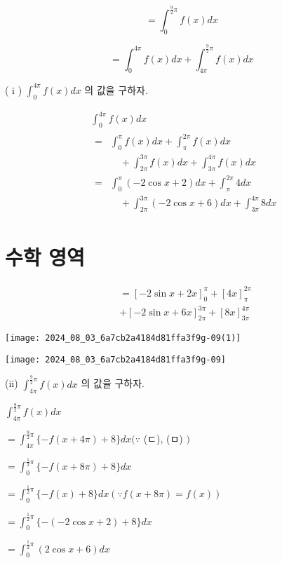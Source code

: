 \documentclass[10pt]{article}
\begin{document}
\[
=\int_{0}^{\frac{9}{2} \pi} f(x) d x
\]

\[
=\int_{0}^{4 \pi} f(x) d x+\int_{4 \pi}^{\frac{9}{2} \pi} f(x) d x
\]

( i ) \(\int_{0}^{4 \pi} f(x) d x\) 의 값을 구하자.

\[
\begin{aligned}
& \int_{0}^{4 \pi} f(x) d x \\
& \begin{aligned}
= & \int_{0}^{\pi} f(x) d x+\int_{\pi}^{2 \pi} f(x) d x \\
& \quad+\int_{2 \pi}^{3 \pi} f(x) d x+\int_{3 \pi}^{4 \pi} f(x) d x \\
= & \int_{0}^{\pi}(-2 \cos x+2) d x+\int_{\pi}^{2 \pi} 4 d x \\
& \quad+\int_{2 \pi}^{3 \pi}(-2 \cos x+6) d x+\int_{3 \pi}^{4 \pi} 8 d x
\end{aligned}
\end{aligned}
\]

\section*{수학 영역}
\[
\begin{aligned}
& =[-2 \sin x+2 x]_{0}^{\pi}+[4 x]_{\pi}^{2 \pi} \\
& +[-2 \sin x+6 x]_{2 \pi}^{3 \pi}+[8 x]_{3 \pi}^{4 \pi}
\end{aligned}
\]

\begin{center}
\texttt{[image: 2024\_08\_03\_6a7cb2a4184d81ffa3f9g-09(1)]}
\end{center}

\begin{center}
\texttt{[image: 2024\_08\_03\_6a7cb2a4184d81ffa3f9g-09]}
\end{center}

(ii) \(\int_{4 \pi}^{\frac{9}{2} \pi} f(x) d x\) 의 값을 구하자.

\(\int_{4 \pi}^{\frac{9}{2} \pi} f(x) d x\)

\(=\int_{4 \pi}^{\frac{9}{2} \pi}\{-f(x+4 \pi)+8\} d x(\because\) (ㄷ), (ㅁ) \()\)

\(=\int_{0}^{\frac{1}{2} \pi}\{-f(x+8 \pi)+8\} d x\)

\(=\int_{0}^{\frac{1}{2} \pi}\{-f(x)+8\} d x(\because f(x+8 \pi)=f(x))\)

\(=\int_{0}^{\frac{1}{2} \pi}\{-(-2 \cos x+2)+8\} d x\)

\(=\int_{0}^{\frac{1}{2} \pi}(2 \cos x+6) d x\)
\end{document}
